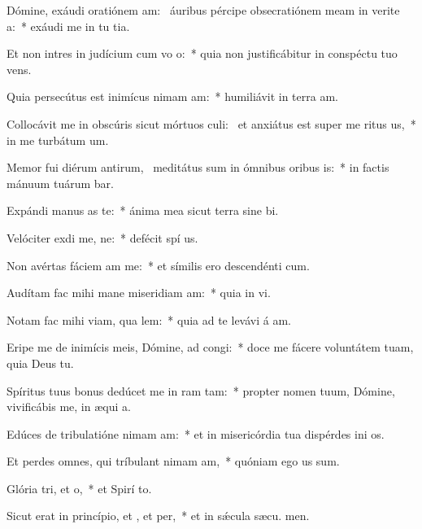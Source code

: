 \item Dómine, exáudi oratiónem am:~\pscross{} áuribus pércipe obsecratiónem meam in verite a:~* exáudi me in tu tia.
\item Et non intres in judícium cum vo o:~* quia non justificábitur in conspéctu tuo  vens.
\item Quia persecútus est inimícus nimam am:~* humiliávit in terra  am.
\item Collocávit me in obscúris sicut mórtuos culi:~\pscross{} et anxiátus est super me ritus us,~* in me turbátum   um.
\item Memor fui diérum antirum,~\pscross{} meditátus sum in ómnibus oribus is:~* in factis mánuum tuárum bar.
\item Expándi manus as  te:~* ánima mea sicut terra sine  bi.
\item Velóciter exdi me, ne:~* defécit spí us.
\item Non avértas fáciem am  me:~* et símilis ero descendénti  cum.
\item Audítam fac mihi mane miseridiam am:~* quia in  vi.
\item Notam fac mihi viam,  qua lem:~* quia ad te levávi á am.
\item Eripe me de inimícis meis, Dómine, ad  congi:~* doce me fácere voluntátem tuam, quia Deus   tu.
\item Spíritus tuus bonus dedúcet me in ram tam:~* propter nomen tuum, Dómine, vivificábis me, in æqui a.
\item Edúces de tribulatióne nimam am:~* et in misericórdia tua dispérdes ini os.
\item Et perdes omnes, qui tríbulant nimam am,~* quóniam ego  us sum.
\item Glória tri, et o,~* et Spirí to.
\item Sicut erat in princípio, et , et per,~* et in sǽcula sæcu. men.
